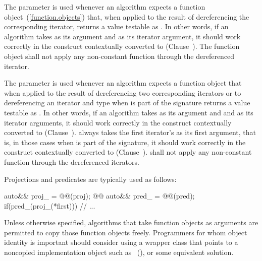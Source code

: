 \begin{removedblock}
\pnum
The
parameter is used whenever an algorithm expects a function object~(\ref{function.objects})
that, when applied to the result
of dereferencing the corresponding iterator, returns a value testable as
.
In other words, if an algorithm
takes
as its argument and 
as its iterator argument, it should work correctly in the
construct
 contextually converted to  (Clause~).
The function object
shall not apply any non-constant
function through the dereferenced iterator.

\pnum
The
parameter is used whenever an algorithm expects a function object that when applied to
the result of dereferencing two corresponding iterators or to dereferencing an
iterator and type
when
is part of the signature returns a value testable as
.
In other words, if an algorithm takes
as its argument and  and  as
its iterator arguments, it should work correctly in
the construct
 contextually converted to  (Clause~).
always takes the first
iterator's 
as its first argument, that is, in those cases when
is part of the signature, it should work
correctly in the
construct  contextually converted to  (Clause~).
 shall not
apply any non-constant function through the dereferenced iterators.
\end{removedblock}

{\color{oldclr} %
\pnum           %
\enternote
Projections and predicates are typically used as follows:

\begin{codeblock}
auto&& proj_ = @@(proj); @@
auto&& pred_ = @@(pred);
if(pred_(proj_(*first))) // ...
\end{codeblock}
\exitnote
} %

\pnum
\enternote
Unless otherwise specified, algorithms that take function objects as arguments
are permitted to copy those function objects freely. Programmers for whom object
identity is important should consider using a wrapper class that points to a
noncopied implementation object such as ~(), or some equivalent solution.
\exitnote

